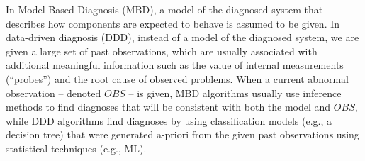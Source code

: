 \documentclass[12pt]{article}
\begin{document}
In Model-Based Diagnosis (MBD), a model of the diagnosed system that describes how components are expected to behave is assumed to be given. In data-driven diagnosis (DDD), instead of a model of the diagnosed system, we are given a large set of past observations, which are usually associated with additional meaningful information such as the value of internal measurements (``probes'') and the root cause of observed problems. 
When a current abnormal observation -- denoted $OBS$ -- is given, MBD algorithms usually use inference methods to find diagnoses that will be consistent with both the model and $OBS$, while DDD algorithms find diagnoses by using classification models (e.g., a decision tree) that were generated a-priori from the given past observations using statistical techniques (e.g., ML). 
\end{document}
